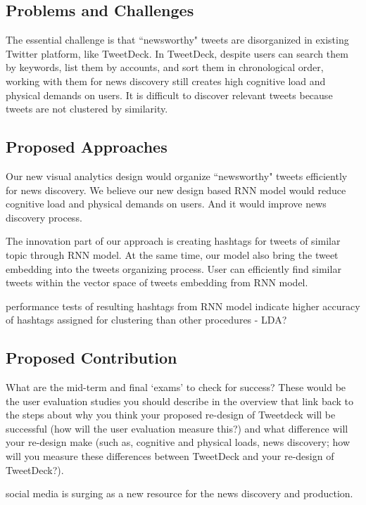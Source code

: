 \subsection{Problems and Challenges}

The essential challenge is that ``newsworthy" tweets are disorganized in existing Twitter platform, like TweetDeck. In TweetDeck, despite users can search them by keywords, list them by accounts, and sort them in chronological order,  working with them for news discovery still creates high cognitive load and physical demands on users. It is difficult to discover relevant tweets because tweets are not clustered by similarity.  

\subsection{Proposed Approaches}

Our new visual analytics design would organize ``newsworthy" tweets efficiently for news discovery. We believe our new design based RNN model would reduce cognitive load and physical demands on users. And it would improve news discovery process. 

The innovation part of our approach is creating hashtags for tweets of similar topic through RNN model. At the same time, our model also bring the tweet embedding into the tweets organizing process.  User can efficiently find similar tweets within the vector space of tweets embedding from RNN model. 

performance tests of resulting hashtags from RNN model indicate higher accuracy of hashtags assigned for clustering than other procedures - LDA?

\subsection{Proposed Contribution}

What are the mid-term and final ‘exams' to check for success?  These would be the user evaluation studies you should describe in the overview that link back to the steps about why you think your proposed re-design of Tweetdeck will be successful (how will the user evaluation measure this?) and what difference will your re-design make (such as, cognitive and physical loads, news discovery; how will you measure these differences between TweetDeck and your re-design of TweetDeck?).



social media is surging as a new resource for the news discovery and production. 

